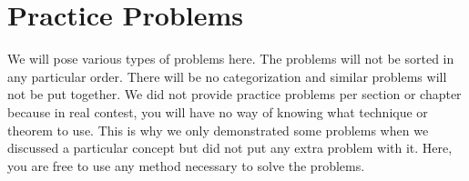 \documentclass[inequalities.tex]{subfile}
\begin{document}
	\chapter{Practice Problems}\label{ch:practice}
	
	We will pose various types of problems here. The problems will not be sorted in any particular order. There will be no categorization and similar problems will not be put together. We did not provide practice problems per section or chapter because in real contest, you will have no way of knowing what technique or theorem to use. This is why we only demonstrated some problems when we discussed a particular concept but did not put any extra problem with it. Here, you are free to use any method necessary to solve the problems.
\end{document}
